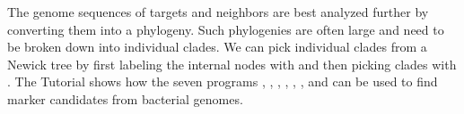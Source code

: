 The genome sequences of targets and neighbors are best analyzed
further by converting them into a phylogeny. Such phylogenies are
often large and need to be broken down into individual clades. We can
pick individual clades from a Newick tree by first labeling the
internal nodes with  and then picking clades
with . The Tutorial shows how the seven
programs , , , ,
, , and  can be used
to find marker candidates from bacterial genomes.
